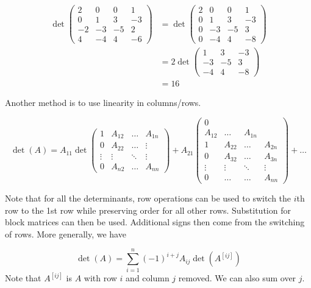 \documentclass[12pt]{article}
\begin{document}
\begin{ex}
	\begin{align*}
		\det\begin{pmatrix} 2 & 0 & 0 & 1 \\ 0 & 1 & 3 & -3 \\ -2 & -3 & -5 & 2 \\ 4 & -4 & 4 & -6 \end{pmatrix}&= \det\begin{pmatrix} 2 & 0 & 0 & 1 \\ 0 & 1 & 3 & -3 \\ 0 & -3 & -5 & 3 \\ 0 & -4 & 4 & -8\end{pmatrix} \\
				      &= 2\det\begin{pmatrix}1 & 3 & -3 \\ -3 & -5 & 3 \\ -4 & 4 & -8\end{pmatrix} \\
				      &= 16
	\end{align*}
\end{ex}

Another method is to use linearity in columns/rows.

$$\det(A) = A_{11}\det\begin{pmatrix}1 & A_{12} & \dots & A_{1n} \\ 0 & A_{22} & \dots & \vdots \\ \vdots & \vdots & \ddots & \vdots \\ 0 & A_{n2} & \dots & A_{nn}\end{pmatrix} + A_{21} \begin{pmatrix} 0 \\ A_{12} & \dots & A_{1n} \\ 1 & A_{22} & \dots & A_{2n} \\ 0 & A_{32} & \dots & A_{3n} \\ \vdots & \vdots & \ddots & \vdots \\ 0 & \dots & \dots & A_{nn}\end{pmatrix} + \dots$$

Note that for all the determinants, row operations can be used to switch the $i$th row to the 1st row while preserving order for all other rows. Substitution for block matrices can then be used. Additional signs then come from the switching of rows. More generally, we have

$$\det(A) = \sum_{i=1}^n (-1)^{i+j}A_{ij}\det(A^{[ij]})$$
Note that $A^{[ij]}$ is $A$ with row $i$ and column $j$ removed. We can also sum over $j$.
\end{document}
